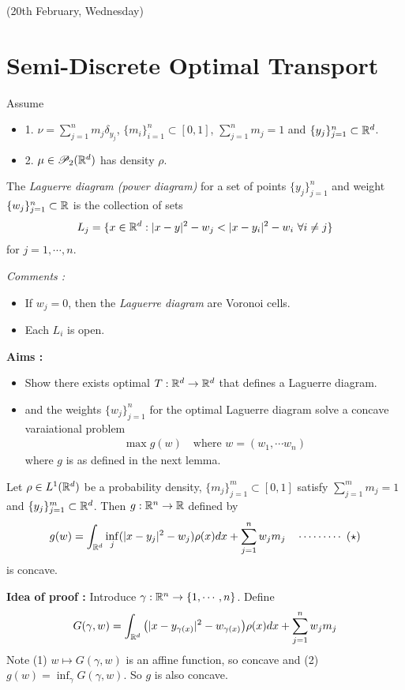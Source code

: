 \documentclass[12pt,a4paper]{article}
\newenvironment{proof}
{\begin{changemargin}{1cm}{0.5cm} 
	}%
	{\end{changemargin}
}
\renewenvironment{i}
{\begin{itemize} 
	}%
	{\end{itemize}
}
\newenvironment{p}
{\begin{proof} 
	}%
	{\end{proof}
}
\begin{document}
\setlength\parindent{0pt}

\setcounter{section}{4}


\newday

(20th February, Wednesday)


\section{Semi-Discrete Optimal Transport}

Assume
\begin{i}
\item[1.] $\nu = \sum_{j=1}^n m_{j} \delta_{y_j}$, $\{m_i\}_{i=1}^n \subset [0,1]$, $\sum_{j=1}^n m_j =1$ and $\{y_j \}_{j=1}^n \subset \mathbb{R}^d$.
\item[2.] $\mu \in \mathscr{P}_2(\mathbb{R}^d)$ has density $\rho$.  
\end{i}
\s

 The \emph{Laguerre diagram (power diagram)} for a set of points $\{y_j\}_{j=1}^n$ and weight $\{w_j\}_{j=1}^n\subset \mathbb{R}$ is the collection of sets
\begin{align*}
L_j = \{x\in \mathbb{R}^d : |x-y|^2 - w_j < |x-y_i|^2 - w_i \,\, \forall i\neq j\}
\end{align*}
for $j=1, \cdots, n$.
\s

\emph{Comments :}
\begin{i}
\item If $w_j =0$, then the \emph{Laguerre diagram} are Voronoi cells.
\item Each $L_i$ is open.
\end{i}
\s

\textbf{Aims :}
\begin{i}
\item Show there exists optimal $T: \mathbb{R}^d \rightarrow \mathbb{R}^d$ that defines a Laguerre diagram.
\item and the weights $\{w_j\}_{j=1}^n$ for the optimal Laguerre diagram solve a concave varaiational problem
\begin{align*}
\max g(w) \quad \text{where } w= (w_1, \cdots w_n)
\end{align*} 
where $g$ is as defined in the next lemma.
\end{i}
\s

 Let $\rho \in L^1(\mathbb{R}^d)$ be a probability density, $\{m_j \}_{j=1}^m \subset [0,1]$ satisfy $\sum_{j=1}^m m_j =1$ and $\{y_j \}_{j=1}^m \subset \mathbb{R}^d$. Then $g: \mathbb{R}^n \rightarrow \mathbb{R}$ defined by 
\begin{align*}
g(w) = \int_{\mathbb{R}^d} \inf_j (|x-y_j|^2 - w_j) \rho(x) dx + \sum_{j=1}^n w_j m_j \quad \cdots\cdots\cdots\,\,(\star)
\end{align*}
is concave.
\begin{p}
\textbf{Idea of proof :} Introduce $\gamma : \mathbb{R}^n \rightarrow \{1, \cdots, n \}$. Define
\begin{align*}
G(\gamma, w) = \int_{\mathbb{R}^d} \big( |x-y_{\gamma(x)}|^2 - w_{\gamma(x)}\big) \rho(x) dx + \sum_{j=1}^n w_j m_j
\end{align*}
Note (1) $w\mapsto G(\gamma, w)$ is an affine function, so concave and (2) $g(w) = \inf_{\gamma} G(\gamma, w)$. So $g$ is also concave.
\end{p}
\s
\end{document}
